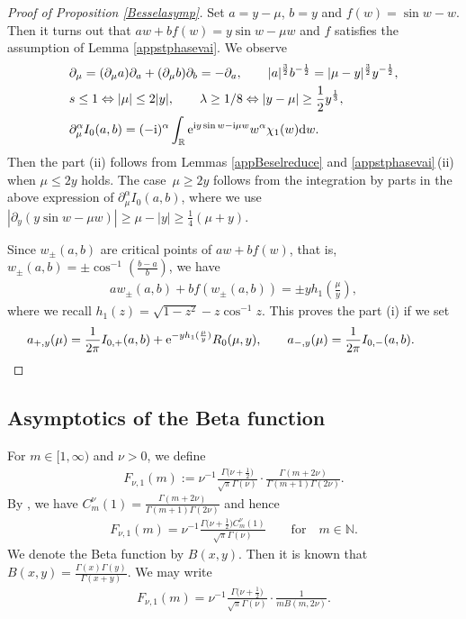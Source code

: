 \documentclass[pdftex]{sigma}
\numberwithin{equation}{section}
\def\R{\mathbb{R}}%
\def\a{\alpha}
\def\l{\lambda}
\def\m{\mu}
\def\n{\nu}
\def\pa{\partial}
\begin{document}
\begin{proof}[Proof of Proposition \ref{Besselasymp}]
Set $a=y-\m$, $b=y$ and $f(w)=\sin w-w$. Then it turns out that $aw+bf(w)=y\sin w-\m w$ and $f$ satisfies the assumption of Lemma \ref{appstphasevai}. We observe
\begin{align*}
&\pa_{\m}=(\pa_{\m} a)\pa_{a}+(\pa_{\m} b)\pa_{b}=-\pa_a,\qquad |a|^{\frac{3}{2}}b^{-\frac{1}{2}}=|\m-y|^{\frac{3}{2}}y^{-\frac{1}{2}},\\
&s\leq 1\Leftrightarrow |\m|\leq 2|y|,\qquad \l\geq 1/8\Leftrightarrow |y-\m|\geq \frac{1}{2}y^{\frac{1}{3}},\\
&\pa_{\m}^{\a}I_0(a,b)=(-{\rm i})^{\a}\int_{\R}{\rm e}^{{\rm i}y \sin w-{\rm i}\m w }w^{\a}\chi_1(w){\rm d}w.
\end{align*}
Then the part (ii) follows from Lemmas \ref{appBeselreduce} and \ref{appstphasevai}\,(ii) when $\m\leq 2y$ holds. The case~${\m\geq 2y}$ follows from the integration by parts in the above expression of $\pa_{\m}^{\a}I_0(a,b)$, where we use $|\pa_y(y \sin w-\m w)|\geq \m-|y|\geq \frac{1}{4}(\m+y)$.

Since $w_{\pm}(a,b)$ are critical points of $aw+bf(w)$, that is, $w_{\pm}(a,b)=\pm\cos^{-1}(\frac{b-a}{b})$, we have
\begin{align*}
aw_{\pm}(a,b)+bf(w_{\pm}(a,b))=\pm yh_1\left(\frac{\m}{y}\right),
\end{align*}
where we recall $h_1(z)=\sqrt{1-z^2}-z\cos^{-1}z$. This proves the part (i) if we set
\begin{align*}
a_{+,y}(\m)=\frac{1}{2\pi}I_{0,+}(a,b)+ {\rm e}^{-yh_1(\frac{\m}{y})} R_0(\m,y),\qquad a_{-,y}(\m)=\frac{1}{2\pi}I_{0,-}(a,b).\tag*{\qed}
\end{align*}\renewcommand{\qed}{}
\end{proof}

\subsection{Asymptotics of the Beta function}\label{subsecasymbeta}

For $m\in [1,\infty)$ and $\n>0$, we define
\begin{align}\label{Fnu1def}
F_{\n,1}(m):=\n^{-1}\frac{\Gamma\bigl(\n+\frac{1}{2}\bigr)}{\sqrt{\pi}\Gamma(\n)}\cdot \frac{\Gamma(m+2\n)}{\Gamma(m+1)\Gamma(2\n)}.
\end{align}
By \cite[Fact 4.8, equation~(4.30)]{BKO}, we have $C_m^{\n}(1)=\frac{\Gamma(m+2\n)}{\Gamma(m+1)\Gamma(2\n)}$ and hence
\begin{align}\label{Fnu1Gegen}
F_{\n,1}(m)=\n^{-1}\frac{\Gamma\bigl(\n+\frac{1}{2}\bigr)C_m^{\n}(1)}{\sqrt{\pi}\Gamma(\n)}\qquad \text{for}\quad m\in\mathbb{N}.
\end{align}
We denote the Beta function by $B(x,y)$. Then it is known that $B(x,y)=\frac{\Gamma(x)\Gamma(y)}{\Gamma(x+y)}$. We may write
\begin{align}\label{Fnu1beta}
F_{\n,1}(m)=\n^{-1}\frac{\Gamma\bigl(\n+\frac{1}{2}\bigr)}{\sqrt{\pi}\Gamma(\n)}\cdot \frac{1}{mB(m,2\n)}.
\end{align}
\end{document}
